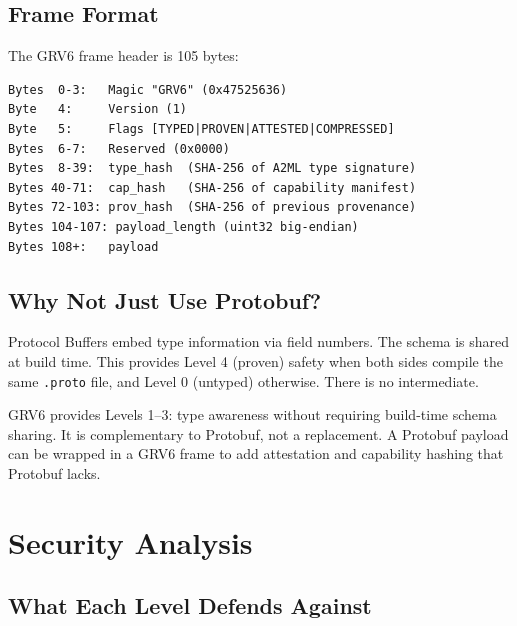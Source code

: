 \documentclass[11pt,a4paper]{article}
\begin{document}
\subsection{Frame Format}

The GRV6 frame header is 105 bytes:

\begin{lstlisting}[caption={GRV6 frame header layout}]
Bytes  0-3:   Magic "GRV6" (0x47525636)
Byte   4:     Version (1)
Byte   5:     Flags [TYPED|PROVEN|ATTESTED|COMPRESSED]
Bytes  6-7:   Reserved (0x0000)
Bytes  8-39:  type_hash  (SHA-256 of A2ML type signature)
Bytes 40-71:  cap_hash   (SHA-256 of capability manifest)
Bytes 72-103: prov_hash  (SHA-256 of previous provenance)
Bytes 104-107: payload_length (uint32 big-endian)
Bytes 108+:   payload
\end{lstlisting}

\subsection{Why Not Just Use Protobuf?}

Protocol Buffers embed type information via field numbers. The schema is
shared at build time. This provides Level 4 (proven) safety when both
sides compile the same \texttt{.proto} file, and Level 0 (untyped)
otherwise. There is no intermediate.

GRV6 provides Levels 1--3: type awareness without requiring build-time
schema sharing. It is complementary to Protobuf, not a replacement.
A Protobuf payload can be wrapped in a GRV6 frame to add attestation
and capability hashing that Protobuf lacks.

\section{Security Analysis}

\subsection{What Each Level Defends Against}
\end{document}
